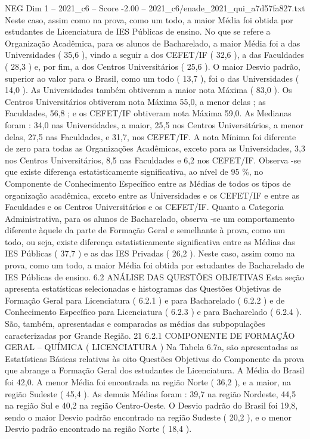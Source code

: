 \begin{textsample}{NEG Dim 1 – 2021\_c6 – Score -2.00 – 2021\_c6/enade\_2021\_qui\_a7d57fa827.txt}
Neste caso, assim como na prova, como um todo, a maior Média foi obtida por estudantes de Licenciatura de IES Públicas de ensino.
No que se refere a Organização Acadêmica, para os alunos de Bacharelado, a maior Média foi a das Universidades ( 35,6 ), vindo a seguir a dos CEFET/IF ( 32,6 ), a das Faculdades ( 28,3 ) e, por fim, a dos Centros Universitários ( 25,6 ).
O maior Desvio padrão, superior ao valor para o Brasil, como um todo ( 13,7 ), foi o das Universidades ( 14,0 ).
As Universidades também obtiveram a maior nota Máxima ( 83,0 ).
Os Centros Universitários obtiveram nota Máxima 55,0, a menor delas ; as Faculdades, 56,8 ; e os CEFET/IF obtiveram nota Máxima 59,0.
As Medianas foram : 34,0 nas Universidades, a maior, 25,5 nos Centros Universitários, a menor delas, 27,5 nas Faculdades, e 31,7, nos CEFET/IF.
A nota Mínima foi diferente de zero para todas as Organizações Acadêmicas, exceto para as Universidades, 3,3 nos Centros Universitários, 8,5 nas Faculdades e 6,2 nos CEFET/IF.
Observa -se que existe diferença estatisticamente significativa, ao nível de 95 \%, no Componente de Conhecimento Específico entre as Médias de todos os tipos de organização acadêmica, exceto entre as Universidades e os CEFET/IF e entre as Faculdades e os Centros Universitários e os CEFET/IF.
Quanto a Categoria Administrativa, para os alunos de Bacharelado, observa -se um comportamento diferente àquele da parte de Formação Geral e semelhante à prova, como um todo, ou seja, existe diferença estatisticamente significativa entre as Médias das IES Públicas ( 37,7 ) e as das IES Privadas ( 26,2 ).
Neste caso, assim como na prova, como um todo, a maior Média foi obtida por estudantes de Bacharelado de IES Públicas de ensino. 6.2 ANÁLISE DAS QUESTÕES OBJETIVAS Esta seção apresenta estatísticas selecionadas e histogramas das Questões Objetivas de Formação Geral para Licenciatura ( 6.2.1 ) e para Bacharelado ( 6.2.2 ) e de Conhecimento Específico para Licenciatura ( 6.2.3 ) e para Bacharelado ( 6.2.4 ).
São, também, apresentadas e comparadas as médias das subpopulações caracterizadas por Grande Região. 21 6.2.1 COMPONENTE DE FORMAÇÃO GERAL – QUÍMICA ( LICENCIATURA ) Na Tabela 6.7a, são apresentadas as Estatísticas Básicas relativas às oito Questões Objetivas do Componente da prova que abrange a Formação Geral dos estudantes de Licenciatura.
A Média do Brasil foi 42,0.
A menor Média foi encontrada na região Norte ( 36,2 ), e a maior, na região Sudeste ( 45,4 ).
As demais Médias foram : 39,7 na região Nordeste, 44,5 na região Sul e 40,2 na região Centro-Oeste.
O Desvio padrão do Brasil foi 19,8, sendo o maior Desvio padrão encontrado na região Sudeste ( 20,2 ), e o menor Desvio padrão encontrado na região Norte ( 18,4 ).

\end{textsample}
